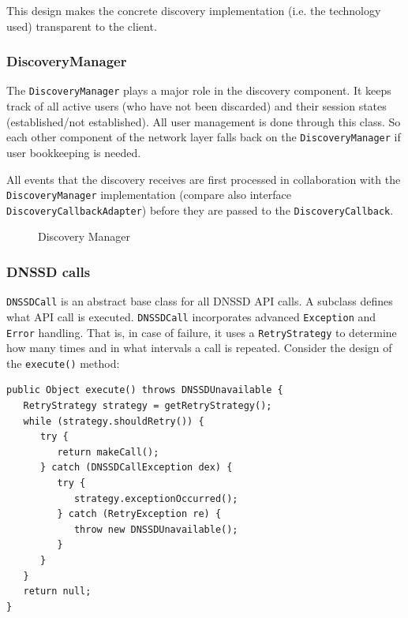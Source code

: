 This design makes the concrete discovery implementation (i.e. the technology used) transparent to the client.


\subsubsection{DiscoveryManager}
The  \texttt{DiscoveryManager} plays a major role in the discovery component. It keeps track of all active users (who have not been discarded) and their session states (established/not established). All user management is done through this class. So each other component of the network layer falls back on the  \texttt{DiscoveryManager} if user bookkeeping is needed.

All events that the discovery receives are first processed in collaboration with the \texttt{DiscoveryManager} implementation (compare also interface \texttt{DiscoveryCallbackAdapter}) before they are passed to the  \texttt{DiscoveryCallback}.

\begin{figure}[H]
 \centering
 \caption{Discovery Manager}
 \label{fig:network.discovery.manager}
\end{figure}


\subsubsection{DNSSD calls}
\texttt{DNSSDCall} is an abstract base class for all DNSSD API calls. A subclass defines what API call is executed. \texttt{DNSSDCall} incorporates advanced \texttt{Exception} and \texttt{Error} handling. That is, in case of failure, it uses a \texttt{RetryStrategy} to determine how many times and in what intervals a call is repeated. Consider the design of the \texttt{execute()} method:

\begin{verbatim}
public Object execute() throws DNSSDUnavailable {
   RetryStrategy strategy = getRetryStrategy();		
   while (strategy.shouldRetry()) {
      try {
         return makeCall();
      } catch (DNSSDCallException dex) {
         try {
            strategy.exceptionOccurred();
         } catch (RetryException re) {
            throw new DNSSDUnavailable();
         }
      }
   }
   return null;
}
\end{verbatim}

